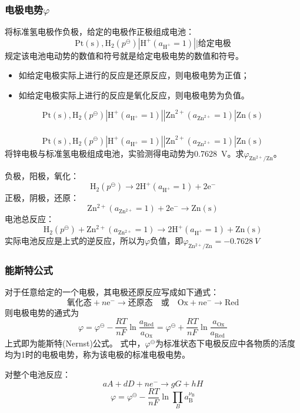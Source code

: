 \documentclass[dvipsnames, svgnames, x11names]{beamer}
\begin{document}
\begin{frame}
    \frametitle{电极电势$\varphi$}

    将标准氢电极作负极，给定的电极作正极组成电池：
    \[
        \mathrm{Pt (s),H_2}(p^\ominus)|\mathrm{H}^+(a_{\mathrm{H}^+}=1)||\text{给定电极}
    \]
    规定该电池电动势的数值和符号就是给定电极电势的数值和符号。
    \begin{itemize}
        \item 如给定电极实际上进行的反应是还原反应，则电极电势为正值；
        \item 如给定电极实际上进行的反应是氧化反应，则电极电势为负值。
    \end{itemize}
    \begin{example}
        \[
        \mathrm{Pt (s),H_2}(p^\ominus)|\mathrm{H}^+(a_{\mathrm{H}^+}=1)||\mathrm{Zn}^{2+}(a_{\mathrm{Zn}^{2+}}=1)|\mathrm{Zn(s)}
        \]
    \end{example}

\end{frame}


\begin{frame}
    \frametitle{}

    \begin{example}
        \[
        \mathrm{Pt (s),H_2}(p^\ominus)|\mathrm{H}^+(a_{\mathrm{H}^+}=1)||\mathrm{Zn}^{2+}(a_{\mathrm{Zn}^{2+}}=1)|\mathrm{Zn(s)}
        \]
        将锌电极与标准氢电极组成电池，实验测得电动势为\SI{0.7628}{V}。求$\varphi_{\mathrm{Zn^{2+}/Zn}}$。

        负极，阳极，氧化：
    \[
        \mathrm{H_2}(p^\ominus) \longrightarrow 2\mathrm{H}^+(a_{\mathrm{H}^+}=1) + 2\mathrm{e}^-
    \]
    正极，阴极，还原：
    \[
        \mathrm{Zn^{2+}}(a_{\mathrm{Zn^{2+}}}=1) + 2\mathrm{e}^- \longrightarrow \mathrm{Zn(s)}
    \]
    电池总反应：
    \[
        \mathrm{H_2}(p^\ominus) + \mathrm{Zn^{2+}}(a_{\mathrm{Zn^{2+}}}=1) \longrightarrow 2\mathrm{H}^+(a_{\mathrm{H}^+}=1) + \mathrm{Zn(s)}
    \]
    实际电池反应是上式的逆反应，所以为$\varphi$负值，即$\varphi_{\mathrm{Zn^{2+}/Zn}}=\SI{-0.7628}{V}$
    \end{example}
    
    
\end{frame}


\begin{frame}
    \frametitle{能斯特公式}

    \large 对于任意给定的一个电极，其电极还原反应写成如下通式：
    \[
        \text{氧化态} + n\mathrm{e^-} \longrightarrow \text{还原态} \quad \text{或} \quad \mathrm{Ox} + n\mathrm{e^-} \longrightarrow \mathrm{Red}
    \]
    则电极电势的通式为
    \[
        \varphi=\varphi^{\ominus}-\frac{R T}{n F} \ln \frac{a_{\mathrm{Red}}}{a_{\mathrm{Ox}}}=\varphi^{\ominus}+\frac{R T}{n F} \ln \frac{a_{\mathrm{Ox}}}{a_{\text {Red }}}
    \]
    上式即为能斯特(Nernst)公式。
    式中，$\varphi^{\ominus}$为标准状态下电极反应中各物质的活度均为1时的电极电势，称为该电极的标准电极电势。

    对整个电池反应：
    \[
        aA + dD +ne^- \rightarrow gG + hH
    \]
    \[
        \varphi=\varphi^{\ominus}-\frac{R T}{n F} \ln \prod \limits_{B} a_\mathrm{B}^{\nu_\mathrm{B}}
    \]
\end{frame}
\end{document}
